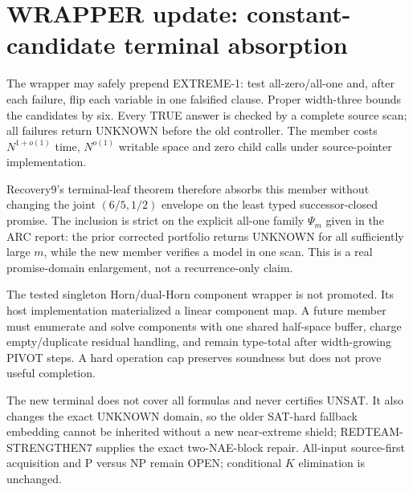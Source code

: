 \section{WRAPPER update: constant-candidate terminal absorption}

The wrapper may safely prepend \textsc{EXTREME-1}: test all-zero/all-one and,
after each failure, flip each variable in one falsified clause.  Proper
width-three bounds the candidates by six.  Every TRUE answer is checked by a
complete source scan; all failures return UNKNOWN before the old controller.
The member costs $N^{1+o(1)}$ time, $N^{o(1)}$ writable space and zero child
calls under source-pointer implementation.

Recovery9's terminal-leaf theorem therefore absorbs this member without
changing the joint $(6/5,1/2)$ envelope on the least typed successor-closed
promise.  The inclusion is strict on the explicit all-one family $\Psi_m$
given in the ARC report: the prior corrected portfolio returns UNKNOWN for
all sufficiently large $m$, while the new member verifies a model in one
scan.  This is a real promise-domain enlargement, not a recurrence-only claim.

The tested singleton Horn/dual-Horn component wrapper is not promoted.  Its
host implementation materialized a linear component map.  A future member
must enumerate and solve components with one shared half-space buffer, charge
empty/duplicate residual handling, and remain type-total after width-growing
PIVOT steps.  A hard operation cap preserves soundness but does not prove
useful completion.

The new terminal does not cover all formulas and never certifies UNSAT.  It
also changes the exact UNKNOWN domain, so the older SAT-hard fallback
embedding cannot be inherited without a new near-extreme shield;
REDTEAM-STRENGTHEN7 supplies the exact two-NAE-block repair.  All-input
source-first acquisition and P versus NP remain OPEN; conditional $K$
elimination is unchanged.
